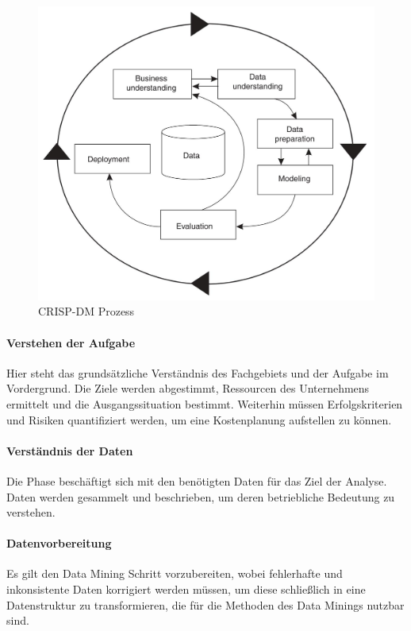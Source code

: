 \begin{figure}[H]
\centering
\includegraphics[scale=0.7]{se-wa-jpg/crisp}
\caption[CRISP-DM Prozess]{CRISP-DM Prozess\protect\footnotemark}
\label{crisp}
\end{figure}


\paragraph{Verstehen der Aufgabe}
Hier steht das grundsätzliche Verständnis des Fachgebiets und der Aufgabe im Vordergrund. Die Ziele werden abgestimmt, Ressourcen des Unternehmens ermittelt und die Ausgangssituation bestimmt. Weiterhin müssen Erfolgskriterien und Risiken quantifiziert werden, um eine Kostenplanung aufstellen zu können. 
\paragraph{Verständnis der Daten}
Die Phase beschäftigt sich mit den benötigten Daten für das Ziel der Analyse. Daten werden gesammelt und beschrieben, um deren betriebliche Bedeutung zu verstehen.
\paragraph{Datenvorbereitung}
Es gilt den Data Mining Schritt vorzubereiten, wobei fehlerhafte und inkonsistente Daten korrigiert werden müssen, um diese schließlich in eine Datenstruktur zu transformieren, die für die Methoden des Data Minings nutzbar sind.
